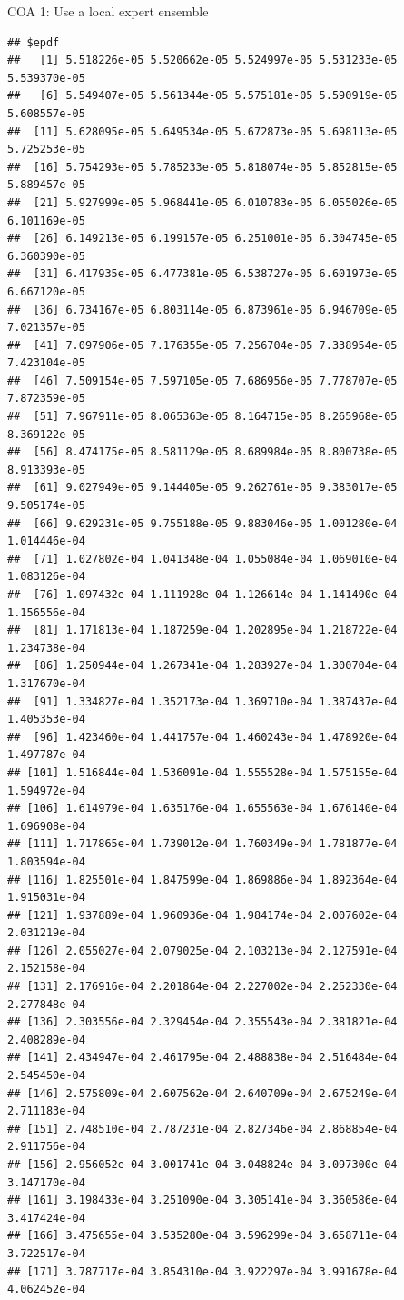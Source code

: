 \documentclass[ignorenonframetext,]{beamer}
\begin{document}
\begin{frame}[fragile]{COA 1: Use a local expert ensemble}
\begin{verbatim}
## $epdf
##   [1] 5.518226e-05 5.520662e-05 5.524997e-05 5.531233e-05 5.539370e-05
##   [6] 5.549407e-05 5.561344e-05 5.575181e-05 5.590919e-05 5.608557e-05
##  [11] 5.628095e-05 5.649534e-05 5.672873e-05 5.698113e-05 5.725253e-05
##  [16] 5.754293e-05 5.785233e-05 5.818074e-05 5.852815e-05 5.889457e-05
##  [21] 5.927999e-05 5.968441e-05 6.010783e-05 6.055026e-05 6.101169e-05
##  [26] 6.149213e-05 6.199157e-05 6.251001e-05 6.304745e-05 6.360390e-05
##  [31] 6.417935e-05 6.477381e-05 6.538727e-05 6.601973e-05 6.667120e-05
##  [36] 6.734167e-05 6.803114e-05 6.873961e-05 6.946709e-05 7.021357e-05
##  [41] 7.097906e-05 7.176355e-05 7.256704e-05 7.338954e-05 7.423104e-05
##  [46] 7.509154e-05 7.597105e-05 7.686956e-05 7.778707e-05 7.872359e-05
##  [51] 7.967911e-05 8.065363e-05 8.164715e-05 8.265968e-05 8.369122e-05
##  [56] 8.474175e-05 8.581129e-05 8.689984e-05 8.800738e-05 8.913393e-05
##  [61] 9.027949e-05 9.144405e-05 9.262761e-05 9.383017e-05 9.505174e-05
##  [66] 9.629231e-05 9.755188e-05 9.883046e-05 1.001280e-04 1.014446e-04
##  [71] 1.027802e-04 1.041348e-04 1.055084e-04 1.069010e-04 1.083126e-04
##  [76] 1.097432e-04 1.111928e-04 1.126614e-04 1.141490e-04 1.156556e-04
##  [81] 1.171813e-04 1.187259e-04 1.202895e-04 1.218722e-04 1.234738e-04
##  [86] 1.250944e-04 1.267341e-04 1.283927e-04 1.300704e-04 1.317670e-04
##  [91] 1.334827e-04 1.352173e-04 1.369710e-04 1.387437e-04 1.405353e-04
##  [96] 1.423460e-04 1.441757e-04 1.460243e-04 1.478920e-04 1.497787e-04
## [101] 1.516844e-04 1.536091e-04 1.555528e-04 1.575155e-04 1.594972e-04
## [106] 1.614979e-04 1.635176e-04 1.655563e-04 1.676140e-04 1.696908e-04
## [111] 1.717865e-04 1.739012e-04 1.760349e-04 1.781877e-04 1.803594e-04
## [116] 1.825501e-04 1.847599e-04 1.869886e-04 1.892364e-04 1.915031e-04
## [121] 1.937889e-04 1.960936e-04 1.984174e-04 2.007602e-04 2.031219e-04
## [126] 2.055027e-04 2.079025e-04 2.103213e-04 2.127591e-04 2.152158e-04
## [131] 2.176916e-04 2.201864e-04 2.227002e-04 2.252330e-04 2.277848e-04
## [136] 2.303556e-04 2.329454e-04 2.355543e-04 2.381821e-04 2.408289e-04
## [141] 2.434947e-04 2.461795e-04 2.488838e-04 2.516484e-04 2.545450e-04
## [146] 2.575809e-04 2.607562e-04 2.640709e-04 2.675249e-04 2.711183e-04
## [151] 2.748510e-04 2.787231e-04 2.827346e-04 2.868854e-04 2.911756e-04
## [156] 2.956052e-04 3.001741e-04 3.048824e-04 3.097300e-04 3.147170e-04
## [161] 3.198433e-04 3.251090e-04 3.305141e-04 3.360586e-04 3.417424e-04
## [166] 3.475655e-04 3.535280e-04 3.596299e-04 3.658711e-04 3.722517e-04
## [171] 3.787717e-04 3.854310e-04 3.922297e-04 3.991678e-04 4.062452e-04

\end{verbatim}
\end{frame}
\end{document}
